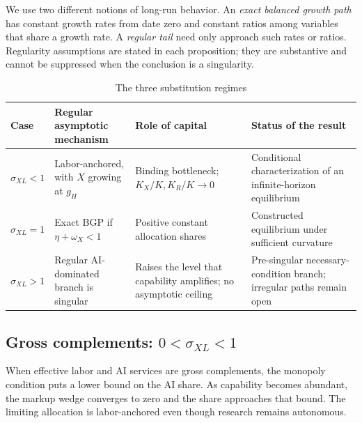 We use two different notions of long-run behavior. An \emph{exact balanced growth path} has constant growth rates from date zero and constant ratios among variables that share a growth rate. A \emph{regular tail} need only approach such rates or ratios. Regularity assumptions are stated in each proposition; they are substantive and cannot be suppressed when the conclusion is a singularity.

\begin{table}[ht]
\centering
\small
\begin{tabular}{@{}L{0.13\textwidth}L{0.29\textwidth}L{0.25\textwidth}L{0.25\textwidth}@{}}
\toprule
Case & Regular asymptotic mechanism & Role of capital & Status of the result\\
\midrule
$\sigma_{XL}<1$ &
Labor-anchored, with $X$ growing at $g_H$ &
Binding bottleneck; $K_X/K,K_R/K\to0$ &
Conditional characterization of an infinite-horizon equilibrium\\
\addlinespace
$\sigma_{XL}=1$ &
Exact BGP if $\eta+\omega_X<1$ &
Positive constant allocation shares &
Constructed equilibrium under sufficient curvature\\
\addlinespace
$\sigma_{XL}>1$ &
Regular AI-dominated branch is singular &
Raises the level that capability amplifies; no asymptotic ceiling &
Pre-singular necessary-condition branch; irregular paths remain open\\
\bottomrule
\end{tabular}
\caption{The three substitution regimes}
\label{tab:three-regimes}
\end{table}

\subsection{Gross complements: \texorpdfstring{$0<\sigma_{XL}<1$}{sigmaXL<1}}

When effective labor and AI services are gross complements, the monopoly condition puts a lower bound on the AI share. As capability becomes abundant, the markup wedge converges to zero and the share approaches that bound. The limiting allocation is labor-anchored even though research remains autonomous.

